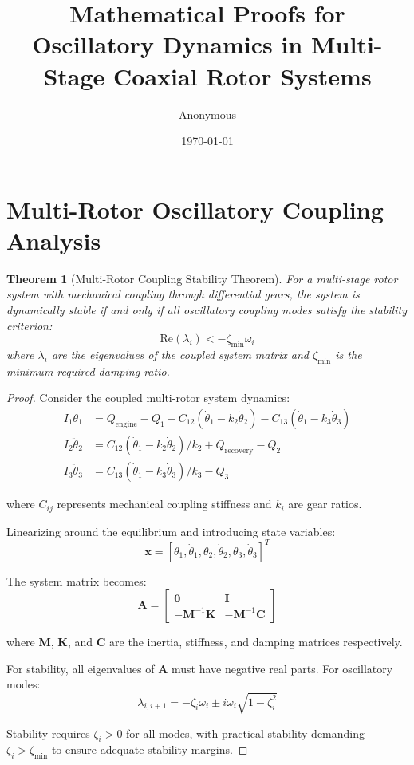 \documentclass{article}
\title{Mathematical Proofs for Oscillatory Dynamics in Multi-Stage Coaxial Rotor Systems}
\author{Anonymous}
\date{\today}
\newtheorem{theorem}{Theorem}
\begin{document}
\maketitle

\section{Multi-Rotor Oscillatory Coupling Analysis}

\begin{theorem}[Multi-Rotor Coupling Stability Theorem]
For a multi-stage rotor system with mechanical coupling through differential gears, the system is dynamically stable if and only if all oscillatory coupling modes satisfy the stability criterion:
\begin{equation}
\text{Re}(\lambda_i) < -\zeta_{\text{min}} \omega_i
\end{equation}
where $\lambda_i$ are the eigenvalues of the coupled system matrix and $\zeta_{\text{min}}$ is the minimum required damping ratio.
\end{theorem}

\begin{proof}
Consider the coupled multi-rotor system dynamics:
\begin{align}
I_1\ddot{\theta}_1 &= Q_{\text{engine}} - Q_1 - C_{12}(\dot{\theta}_1 - k_2\dot{\theta}_2) - C_{13}(\dot{\theta}_1 - k_3\dot{\theta}_3) \\
I_2\ddot{\theta}_2 &= C_{12}(\dot{\theta}_1 - k_2\dot{\theta}_2)/k_2 + Q_{\text{recovery}} - Q_2 \\
I_3\ddot{\theta}_3 &= C_{13}(\dot{\theta}_1 - k_3\dot{\theta}_3)/k_3 - Q_3
\end{align}

where $C_{ij}$ represents mechanical coupling stiffness and $k_i$ are gear ratios.

Linearizing around the equilibrium and introducing state variables:
$$\mathbf{x} = [\theta_1, \dot{\theta}_1, \theta_2, \dot{\theta}_2, \theta_3, \dot{\theta}_3]^T$$

The system matrix becomes:
\begin{equation}
\mathbf{A} = \begin{bmatrix}
\mathbf{0} & \mathbf{I} \\
-\mathbf{M}^{-1}\mathbf{K} & -\mathbf{M}^{-1}\mathbf{C}
\end{bmatrix}
\end{equation}

where $\mathbf{M}$, $\mathbf{K}$, and $\mathbf{C}$ are the inertia, stiffness, and damping matrices respectively.

For stability, all eigenvalues of $\mathbf{A}$ must have negative real parts. For oscillatory modes:
$$\lambda_{i,i+1} = -\zeta_i \omega_i \pm i\omega_i\sqrt{1-\zeta_i^2}$$

Stability requires $\zeta_i > 0$ for all modes, with practical stability demanding $\zeta_i > \zeta_{\text{min}}$ to ensure adequate stability margins.
\end{proof}
\end{document}

